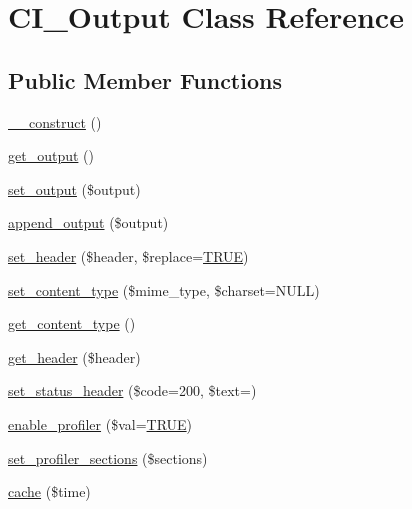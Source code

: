 \hypertarget{class_c_i___output}{}\section{C\+I\+\_\+\+Output Class Reference}
\label{class_c_i___output}
\subsection*{Public Member Functions}
\begin{DoxyCompactItemize}
\item 
\mbox{\hyperlink{class_c_i___output_a095c5d389db211932136b53f25f39685}{\+\_\+\+\_\+construct}} ()
\item 
\mbox{\hyperlink{class_c_i___output_aa6c3f8688f804de4f1af8a462fffb922}{get\+\_\+output}} ()
\item 
\mbox{\hyperlink{class_c_i___output_afcff30d791a8006216f5c2fe93a95983}{set\+\_\+output}} (\$output)
\item 
\mbox{\hyperlink{class_c_i___output_a7c79b8239d6ecbba0c8fdd00bb619651}{append\+\_\+output}} (\$output)
\item 
\mbox{\hyperlink{class_c_i___output_a270389a1636faa81eda5ef3fa900ea25}{set\+\_\+header}} (\$header, \$replace=\mbox{\hyperlink{constants_8php_ae04a3efe6aa42044f803ee90c2277846}{T\+R\+UE}})
\item 
\mbox{\hyperlink{class_c_i___output_a7e04aad8dafeec2b8626285e81231f0c}{set\+\_\+content\+\_\+type}} (\$mime\+\_\+type, \$charset=N\+U\+LL)
\item 
\mbox{\hyperlink{class_c_i___output_a4d8c59d65c47c9146dbc1c7d0c4eccf2}{get\+\_\+content\+\_\+type}} ()
\item 
\mbox{\hyperlink{class_c_i___output_afc84ca7f4f93817160ea738f2f899a74}{get\+\_\+header}} (\$header)
\item 
\mbox{\hyperlink{class_c_i___output_a6fa308cb1fadec4938edade0a51eb773}{set\+\_\+status\+\_\+header}} (\$code=200, \$text=\textquotesingle{}\textquotesingle{})
\item 
\mbox{\hyperlink{class_c_i___output_a7bd693db25952e1b074630f52ee67500}{enable\+\_\+profiler}} (\$val=\mbox{\hyperlink{constants_8php_ae04a3efe6aa42044f803ee90c2277846}{T\+R\+UE}})
\item 
\mbox{\hyperlink{class_c_i___output_ac5e50de443748cf3d356d29eba2caaaf}{set\+\_\+profiler\+\_\+sections}} (\$sections)
\item 
\mbox{\hyperlink{class_c_i___output_a6eae3cd828cf30926d44f1ab6011f939}{cache}} (\$time)

\end{DoxyCompactItemize}
